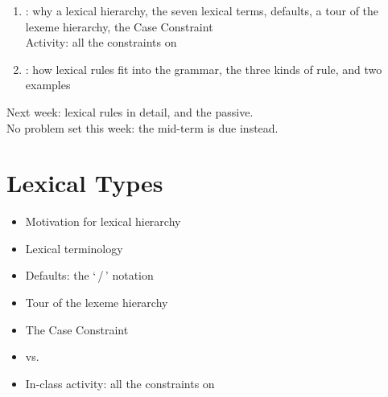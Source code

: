 \documentclass[a4paper,landscape,headrule,footrule]{foils}
\begin{document}
\maketitle



\begin{enumerate}
\item {}: why a lexical hierarchy, the seven lexical
  terms, defaults, a tour of the lexeme hierarchy, the Case Constraint
  \\ Activity: all the constraints on 
\item {}: how lexical rules fit into the
  grammar, the three kinds of rule, and two examples
\end{enumerate}
\bigskip
Next week: lexical rules in detail, and the passive. \\
No problem set this week: the mid-term is due instead.


\section{Lexical Types}

\begin{itemize}
\item Motivation for lexical hierarchy
\item Lexical terminology
\item Defaults: the `\,/\,' notation
\item Tour of the lexeme hierarchy
\item The Case Constraint
\item {} vs.\ 
\item In-class activity: all the constraints on 
\end{itemize}
\end{document}
